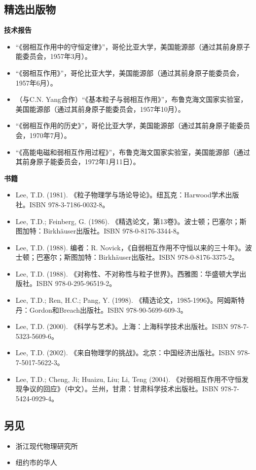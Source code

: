 \subsection{精选出版物}  
\textbf{技术报告}
\begin{itemize}
\item “《弱相互作用中的守恒定律》”，哥伦比亚大学，美国能源部（通过其前身原子能委员会，1957年3月）。  
\item “《弱相互作用》”，哥伦比亚大学，美国能源部（通过其前身原子能委员会，1957年6月）。  
\item （与C.N. Yang合作）“《基本粒子与弱相互作用》”，布鲁克海文国家实验室，美国能源部（通过其前身原子能委员会，1957年10月）。  
\item “《弱相互作用的历史》”，哥伦比亚大学，美国能源部（通过其前身原子能委员会，1970年7月）。  
\item “《高能电磁和弱相互作用过程》”，布鲁克海文国家实验室，美国能源部（通过其前身原子能委员会，1972年1月11日）。
\end{itemize}
\textbf{书籍}  
\begin{itemize}
\item Lee, T.D. (1981). 《粒子物理学与场论导论》。纽瓦克：Harwood学术出版社。ISBN 978-3-7186-0032-8。  
\item Lee, T.D.; Feinberg, G. (1986). 《精选论文，第13卷》。波士顿；巴塞尔；斯图加特：Birkhäuser出版社。ISBN 978-0-8176-3344-8。  
\item Lee, T.D. (1988). 编者：R. Novick，《自弱相互作用不守恒以来的三十年》。波士顿；巴塞尔；斯图加特：Birkhäuser出版社。ISBN 978-0-8176-3375-2。  
\item Lee, T.D. (1988). 《对称性、不对称性与粒子世界》。西雅图：华盛顿大学出版社。ISBN 978-0-295-96519-2。  
\item Lee, T.D.; Ren, H.C.; Pang, Y. (1998). 《精选论文，1985-1996》。阿姆斯特丹：Gordon和Breach出版社。ISBN 978-90-5699-609-3。  
\item Lee, T.D. (2000). 《科学与艺术》。上海：上海科学技术出版社。ISBN 978-7-5323-5609-6。  
\item Lee, T.D. (2002). 《来自物理学的挑战》。北京：中国经济出版社。ISBN 978-7-5017-5622-3。  
\item Lee, T.D.; Cheng, Ji; Huaizu, Liu; Li, Teng (2004). 《对弱相互作用不守恒发现争议的回应》（中文）。兰州，甘肃：甘肃科学技术出版社。ISBN 978-7-5424-0929-4。
\end{itemize}
\subsection{另见}
\begin{itemize}
\item 浙江现代物理研究所  
\item 纽约市的华人
\end{itemize}
